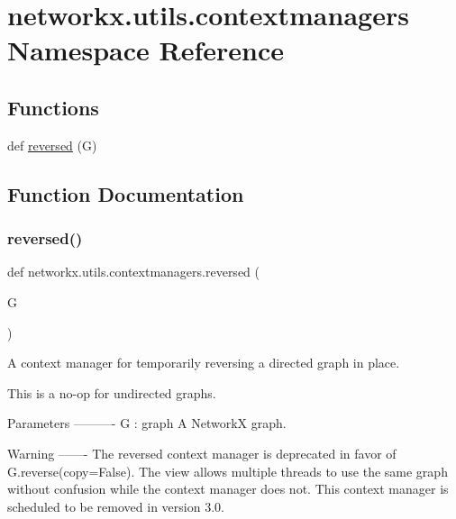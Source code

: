 \hypertarget{namespacenetworkx_1_1utils_1_1contextmanagers}{}\section{networkx.\+utils.\+contextmanagers Namespace Reference}
\label{namespacenetworkx_1_1utils_1_1contextmanagers}
\subsection*{Functions}
\begin{DoxyCompactItemize}
\item 
def \hyperlink{namespacenetworkx_1_1utils_1_1contextmanagers_a4e3b4106b6f9cb6fc63f243422536eab}{reversed} (G)
\end{DoxyCompactItemize}


\subsection{Function Documentation}
\mbox{\label{namespacenetworkx_1_1utils_1_1contextmanagers_a4e3b4106b6f9cb6fc63f243422536eab}} 
\subsubsection{\texorpdfstring{reversed()}{reversed()}}
{\footnotesize\ttfamily def networkx.\+utils.\+contextmanagers.\+reversed (\begin{DoxyParamCaption}\item[{}]{G }\end{DoxyParamCaption})}

\begin{DoxyVerb}A context manager for temporarily reversing a directed graph in place.

This is a no-op for undirected graphs.

Parameters
----------
G : graph
    A NetworkX graph.

Warning
-------
The reversed context manager is deprecated in favor
of G.reverse(copy=False). The view allows multiple threads to use the
same graph without confusion while the context manager does not.
This context manager is scheduled to be removed in version 3.0.
\end{DoxyVerb}
 